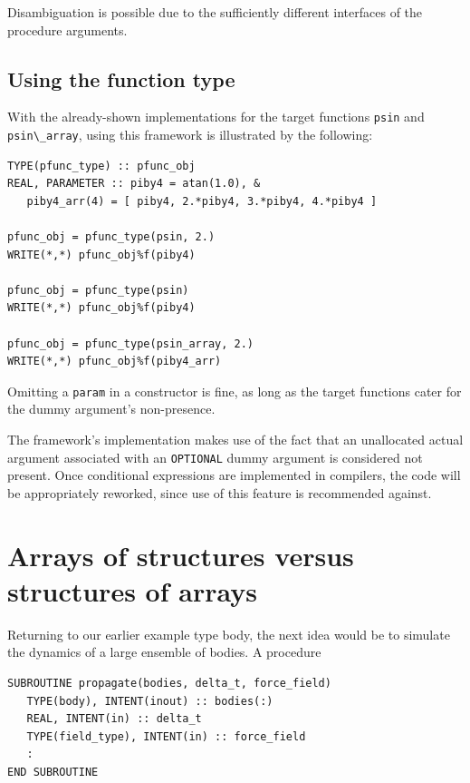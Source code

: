 \documentclass[
  paper=a4,
  ,captions=tableheading
]{scrartcl}
\newcommand{\passthrough}[1]{#1}
\begin{document}
Disambiguation is possible due to the sufficiently different interfaces
of the procedure arguments.

\subsection{Using the function type}\label{using-the-function-type}

With the already-shown implementations for the target functions
\passthrough{\lstinline!psin!} and
\passthrough{\lstinline!psin\_array!}, using this framework is
illustrated by the following:

\begin{lstlisting}
TYPE(pfunc_type) :: pfunc_obj
REAL, PARAMETER :: piby4 = atan(1.0), &
   piby4_arr(4) = [ piby4, 2.*piby4, 3.*piby4, 4.*piby4 ]

pfunc_obj = pfunc_type(psin, 2.)
WRITE(*,*) pfunc_obj%f(piby4)

pfunc_obj = pfunc_type(psin)
WRITE(*,*) pfunc_obj%f(piby4)

pfunc_obj = pfunc_type(psin_array, 2.)
WRITE(*,*) pfunc_obj%f(piby4_arr)
\end{lstlisting}

Omitting a \passthrough{\lstinline!param!} in a constructor is fine, as
long as the target functions cater for the dummy argument's
non-presence.

The framework's implementation makes use of the fact that an unallocated
actual argument associated with an \passthrough{\lstinline!OPTIONAL!}
dummy argument is considered not present. Once conditional expressions
are implemented in compilers, the code will be appropriately reworked,
since use of this feature is recommended against.

\section{Arrays of structures versus structures of
arrays}\label{arrays-of-structures-versus-structures-of-arrays}

Returning to our earlier example type body, the next idea would be to
simulate the dynamics of a large ensemble of bodies. A procedure

\begin{lstlisting}
SUBROUTINE propagate(bodies, delta_t, force_field)
   TYPE(body), INTENT(inout) :: bodies(:)
   REAL, INTENT(in) :: delta_t
   TYPE(field_type), INTENT(in) :: force_field
   :
END SUBROUTINE
\end{lstlisting}
\end{document}
